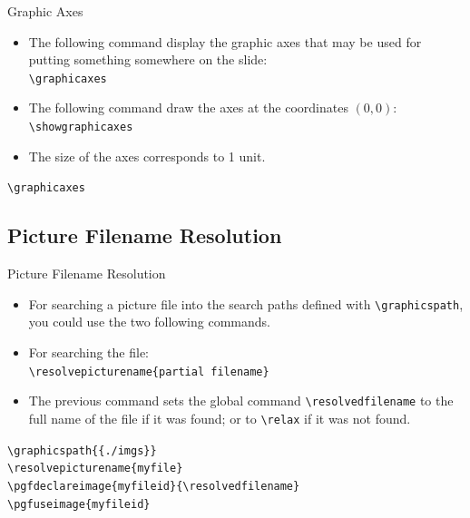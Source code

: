 \documentclass[english,sectioncirclenumberstyle]{ciadbeamer}
\begin{document}
\begin{frame}{Graphic Axes}
	\begin{itemize}
	\item The following command display the graphic axes that may be used for putting something somewhere on the slide: \\
		\texttt{{\textbackslash}graphicaxes}
	\item The following command draw the axes at the coordinates $(0,0)$: \\
		\texttt{{\textbackslash}showgraphicaxes}
	\item The size of the axes corresponds to 1 unit.
	\end{itemize}
	\begin{example}
		\texttt{{\textbackslash}graphicaxes}\\
		\graphicaxes
	\end{example}
\end{frame}

\subsection{Picture Filename Resolution}

\begin{frame}{Picture Filename Resolution}
	\begin{itemize}
	\item For searching a picture file into the search paths defined with \texttt{{\textbackslash}graphicspath}, you could use the two following commands.
	\item For searching the file: \\
		\texttt{{\textbackslash}resolvepicturename\{partial filename\}}
	\item The previous command sets the global command \texttt{{\textbackslash}resolvedfilename} to the full name of the file if it was found; or to \texttt{{\textbackslash}relax} if it was not found.
	\end{itemize}
	\begin{example}
		\texttt{{\textbackslash}graphicspath\{\{./imgs\}\}} \\
		\texttt{{\textbackslash}resolvepicturename\{myfile\}} \\
		\texttt{{\textbackslash}pgfdeclareimage\{myfileid\}\{{\textbackslash}resolvedfilename\}} \\
		\texttt{{\textbackslash}pgfuseimage\{myfileid\}} \\
	\end{example}
\end{frame}
\end{document}
